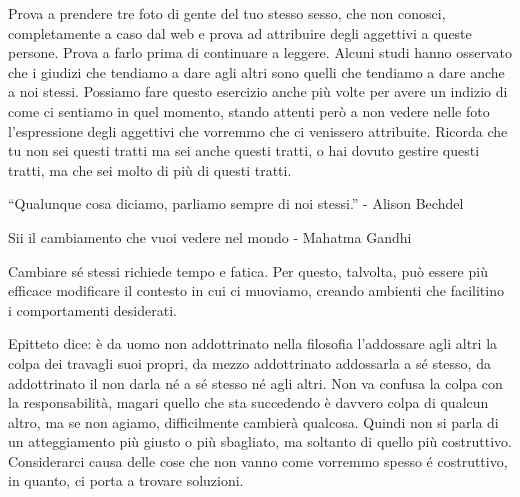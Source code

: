 \documentclass[12pt]{book} %
\begin{document}
Prova a prendere tre foto di gente del tuo stesso sesso, che non conosci, completamente a caso dal web e prova ad attribuire degli aggettivi a queste persone. 
Prova a farlo prima di continuare a leggere.
Alcuni studi hanno osservato che i giudizi che tendiamo a dare agli altri sono quelli che tendiamo a dare anche a noi stessi. Possiamo fare questo esercizio anche più volte per avere un indizio di come ci sentiamo in quel momento, stando attenti però a non vedere nelle foto l'espressione degli aggettivi che vorremmo che ci venissero attribuite. Ricorda che tu non sei questi tratti ma sei anche questi tratti, o hai dovuto gestire questi tratti, ma che sei molto di più di questi tratti.

“Qualunque cosa diciamo, parliamo sempre di noi stessi.” - Alison Bechdel

Sii il cambiamento che vuoi vedere nel mondo - Mahatma Gandhi

Cambiare sé stessi richiede tempo e fatica. Per questo, talvolta, può essere più efficace modificare il contesto in cui ci muoviamo, creando ambienti che facilitino i comportamenti desiderati.

Epitteto dice: è da uomo non addottrinato nella filosofia l'addossare agli altri la colpa dei
travagli suoi propri, da mezzo addottrinato addossarla a sé stesso, da addottrinato il non darla né a sé stesso né agli
altri. Non va confusa la colpa con la responsabilità, magari quello che sta succedendo è davvero colpa di qualcun altro, ma se non agiamo, difficilmente cambierà qualcosa. Quindi non si parla di un atteggiamento più giusto o più sbagliato, ma soltanto di quello più
costruttivo. Considerarci causa delle cose che non vanno come vorremmo spesso é costruttivo, in quanto, ci porta a trovare soluzioni. 
\end{document}
